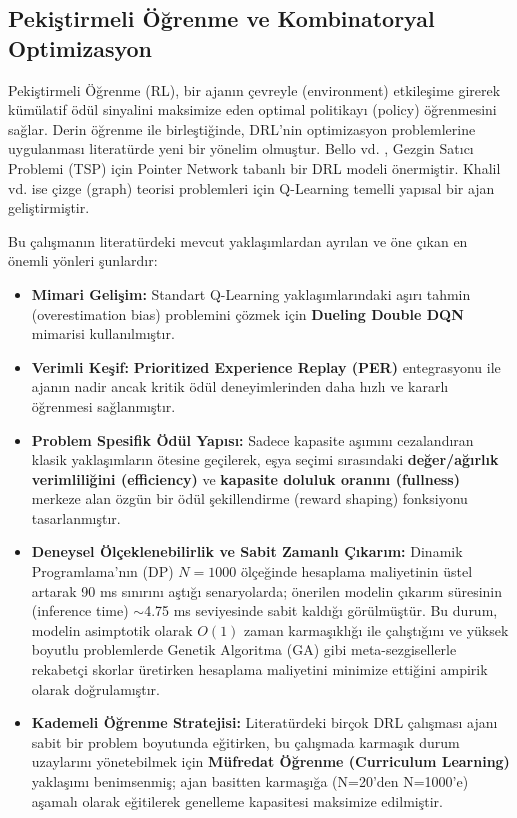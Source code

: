 \documentclass[conference]{IEEEtran}
\begin{document}
\subsection{Pekiştirmeli Öğrenme ve Kombinatoryal Optimizasyon}
Pekiştirmeli Öğrenme (RL), bir ajanın çevreyle (environment) etkileşime girerek kümülatif ödül sinyalini maksimize eden optimal politikayı (policy) öğrenmesini sağlar. Derin öğrenme ile birleştiğinde, DRL'nin optimizasyon problemlerine uygulanması literatürde yeni bir yönelim olmuştur. Bello vd. \cite{bello2017}, Gezgin Satıcı Problemi (TSP) için Pointer Network tabanlı bir DRL modeli önermiştir. Khalil vd. \cite{khalil2017} ise çizge (graph) teorisi problemleri için Q-Learning temelli yapısal bir ajan geliştirmiştir.

Bu çalışmanın literatürdeki mevcut yaklaşımlardan ayrılan ve öne çıkan en önemli yönleri şunlardır:
\begin{itemize}
    \item \textbf{Mimari Gelişim:} Standart Q-Learning yaklaşımlarındaki aşırı tahmin (overestimation bias) problemini çözmek için \textbf{Dueling Double DQN} mimarisi kullanılmıştır.
    \item \textbf{Verimli Keşif:} \textbf{Prioritized Experience Replay (PER)} entegrasyonu ile ajanın nadir ancak kritik ödül deneyimlerinden daha hızlı ve kararlı öğrenmesi sağlanmıştır.
    \item \textbf{Problem Spesifik Ödül Yapısı:} Sadece kapasite aşımını cezalandıran klasik yaklaşımların ötesine geçilerek, eşya seçimi sırasındaki \textbf{değer/ağırlık verimliliğini (efficiency)} ve \textbf{kapasite doluluk oranını (fullness)} merkeze alan özgün bir ödül şekillendirme (reward shaping) fonksiyonu tasarlanmıştır.
    \item \textbf{Deneysel Ölçeklenebilirlik ve Sabit Zamanlı Çıkarım:} Dinamik Programlama'nın (DP) $N=1000$ ölçeğinde hesaplama maliyetinin üstel artarak 90 ms sınırını aştığı senaryolarda; önerilen modelin çıkarım süresinin (inference time) $\sim$4.75 ms seviyesinde sabit kaldığı görülmüştür. Bu durum, modelin asimptotik olarak $O(1)$ zaman karmaşıklığı ile çalıştığını ve yüksek boyutlu problemlerde Genetik Algoritma (GA) gibi meta-sezgisellerle rekabetçi skorlar üretirken hesaplama maliyetini minimize ettiğini ampirik olarak doğrulamıştır.
    \item \textbf{Kademeli Öğrenme Stratejisi:} Literatürdeki birçok DRL çalışması ajanı sabit bir problem boyutunda eğitirken, bu çalışmada karmaşık durum uzaylarını yönetebilmek için \textbf{Müfredat Öğrenme (Curriculum Learning)} yaklaşımı benimsenmiş; ajan basitten karmaşığa (N=20'den N=1000'e) aşamalı olarak eğitilerek genelleme kapasitesi maksimize edilmiştir.
\end{itemize}
\end{document}
